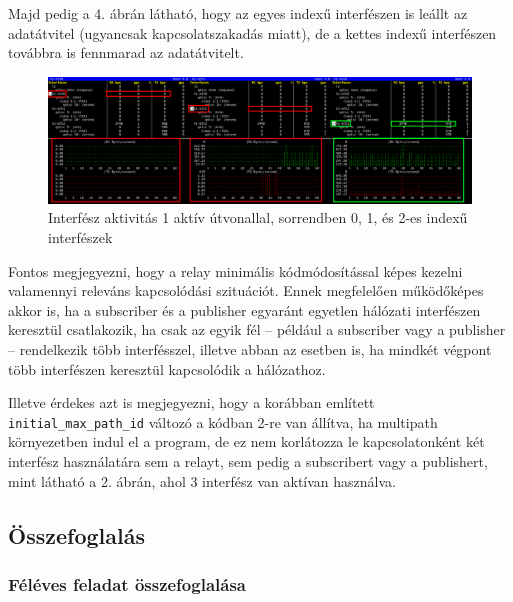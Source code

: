 \documentclass[a4paper,oneside]{article}
\begin{document}
Majd pedig a 4. ábrán látható, hogy az egyes indexű interfészen is leállt az adatátvitel (ugyancsak 
kapcsolatszakadás miatt), de a kettes indexű interfészen továbbra is fennmarad az adatátvitelt.

\begin{figure}[h]
  \centering
    \hspace*{-1.5cm}%
    \includegraphics[width=18cm]{bmon33}
\caption{Interfész aktivitás 1 aktív útvonallal, sorrendben 0, 1, és 2-es indexű interfészek}
\end{figure}

Fontos megjegyezni, hogy a relay minimális kódmódosítással képes kezelni valamennyi 
releváns kapcsolódási szituációt. Ennek megfelelően működőképes akkor is, ha a subscriber és a 
publisher egyaránt egyetlen hálózati interfészen keresztül csatlakozik, ha csak az egyik 
fél – például a subscriber vagy a publisher – rendelkezik több interfésszel, illetve abban 
az esetben is, ha mindkét végpont több interfészen keresztül kapcsolódik a hálózathoz.


Illetve érdekes azt is megjegyezni, hogy a korábban említett 
  \texttt{initial\_max\_path\_id}
változó a kódban 2-re van állítva, ha multipath környezetben indul el a program,
de ez nem korlátozza le kapcsolatonként két interfész használatára sem a relayt, sem pedig a 
subscribert vagy a publishert, mint látható a 2. ábrán, ahol 3 interfész van aktívan használva.

\subsection{Összefoglalás}
\label{sec:osszefoglalas}

\subsubsection{Féléves feladat összefoglalása}
\paragraph{}
\end{document}
